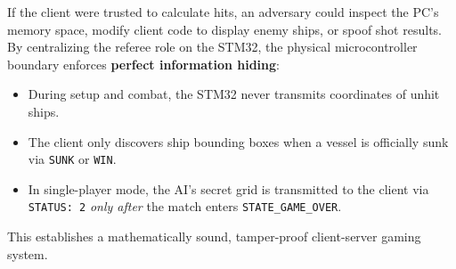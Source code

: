 If the client were trusted to calculate hits, an adversary could inspect the PC's memory space, modify client code to display enemy ships, or spoof shot results. By centralizing the referee role on the STM32, the physical microcontroller boundary enforces \textbf{perfect information hiding}:
\begin{itemize}
    \item During setup and combat, the STM32 never transmits coordinates of unhit ships. 
    \item The client only discovers ship bounding boxes when a vessel is officially sunk via \texttt{SUNK} or \texttt{WIN}.
    \item In single-player mode, the AI's secret grid is transmitted to the client via \texttt{STATUS: 2} \textit{only after} the match enters \texttt{STATE\_GAME\_OVER}.
\end{itemize}
This establishes a mathematically sound, tamper-proof client-server gaming system.
